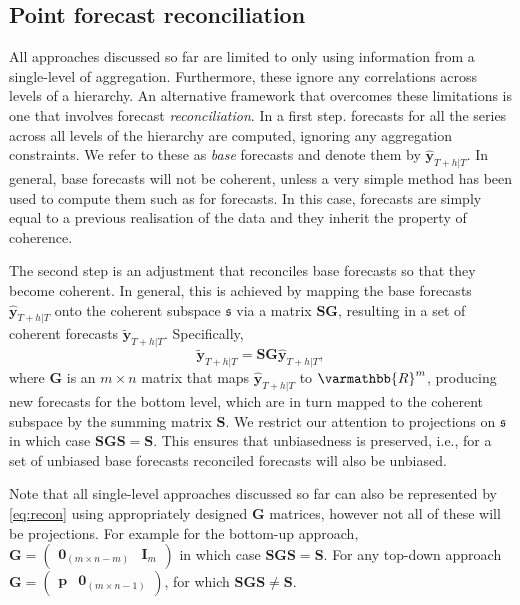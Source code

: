 {\subsection{Point forecast reconciliation}\label{sec:reconciliation approaches}

All approaches discussed so far are limited to only using information from a single-level of aggregation. Furthermore, these ignore any correlations across levels of a hierarchy. An alternative framework that overcomes these limitations is one that involves forecast \textit{reconciliation}. In a first step. forecasts for all the series across all levels of the hierarchy are computed, ignoring any aggregation constraints. We refer to these as \textit{base} forecasts and denote them by $\hat{\bm{y}}_{T+h|T}$. In general, base forecasts will not be coherent, unless a very simple method has been used to compute them such as for \naive forecasts. In this case, forecasts are simply equal to a previous realisation of the data and they inherit the property of coherence.

The second step is an adjustment that reconciles base forecasts so that they become coherent. In general, this is achieved by mapping the base forecasts $\hat{\bm{y}}_{T+h|T}$ onto the coherent subspace $\mathfrak{s}$ via a matrix $\bm{S}\bm{G}$, resulting in a set of coherent forecasts $\tilde{\bm{y}}_{T+h|T}$. Specifically,
\begin{equation}\label{eq:recon}
	\tilde{\bm{y}}_{T+h|T}=\bm{S}\bm{G}\hat{\bm{y}}_{T+h|T},
\end{equation}
where $\bm{G}$ is an $m\times n$ matrix that maps $\hat{\bm{y}}_{T+h|T}$ to $\varmathbb{R}^m$, producing new forecasts for the bottom level, which are in turn mapped to the coherent subspace by the summing matrix $\bm{S}$. We restrict our attention to projections on $\mathfrak{s}$ in which case $\bm{S}\bm{G}\bm{S}=\bm{S}$. This ensures that unbiasedness is preserved, i.e., for a set of unbiased base forecasts reconciled forecasts will also be unbiased.

Note that all single-level approaches discussed so far can also be represented by \eqref{eq:recon} using appropriately designed $\bm{G}$ matrices, however not all of these will be projections. For example for the bottom-up approach, $\bm{G}=\begin{pmatrix}
		\bm{0}_{(m \times n-m)} & \bm{I}_m
	\end{pmatrix}$ in which case $\bm{S}\bm{G}\bm{S}=\bm{S}$. For any top-down approach
$\bm{G}=\begin{pmatrix}
		\bm{p} & \bm{0}_{(m \times n-1)}
	\end{pmatrix}$, for which $\bm{S}\bm{G}\bm{S}\ne\bm{S}$.

}
